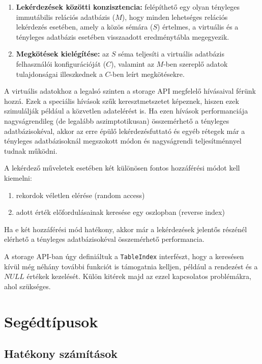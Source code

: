 \documentclass[
    parspace,
    noindent,
    nohyp,
]{elteiktdk}[2023/04/10]
\begin{document}
\begin{enumerate}
  \item \textbf{Lekérdezések közötti konzisztencia:}
        felépíthető egy olyan tényleges immutábilis relációs adatbázis ($M$),
        hogy minden lehetséges relációs lekérdezés esetében, amely a közös sémára ($S$) értelmes,
        a virtuális és a tényleges adatbázis esetében visszaadott eredménytábla megegyezik.
  \item \textbf{Megkötések kielégítése:}
        az $S$ séma teljesíti a virtuális adatbázis felhasználói konfigurációját ($C$),
        valamint az $M$-ben szereplő adatok tulajdonságai illeszkednek a $C$-ben leírt megkötésekre.
\end{enumerate}

A virtuális adatokhoz a legalsó szinten a storage API megfelelő hívásaival férünk hozzá.
Ezek a speciális hívások szűk keresztmetszetet képeznek,
hiszen ezek szimulálják például a közvetlen adatelérést is.
Ha ezen hívások performanciája nagyságrendileg (de legalább aszimptotikusan) összemérhető a tényleges adatbázisokéval,
akkor az erre épülő lekérdezésfuttató és egyéb rétegek már
a tényleges adatbázisoknál megszokott módon és nagyságrendi teljesítménnyel tudnak működni.

A lekérdező műveletek esetében két különösen fontos hozzáférési módot kell kiemelni:

\begin{enumerate}
  \item rekordok véletlen elérése (random access)
  \item adott érték előfordulásainak keresése egy oszlopban (reverse index)
\end{enumerate}

Ha e két hozzáférési mód hatékony, akkor már a lekérdezések jelentős részénél
elérhető a tényleges adatbázisokéval összemérhető performancia.

A storage API-ban úgy definiáltuk a \texttt{TableIndex} interfészt,
hogy a keresésen kívül még néhány további funkciót is támogatnia kelljen,
például a rendezést és a $NULL$ értékek kezelését.
Külön kitérek majd az ezzel kapcsolatos problémákra, ahol szükséges.

\section{Segédtípusok}

\subsection{Hatékony számítások}
\end{document}
